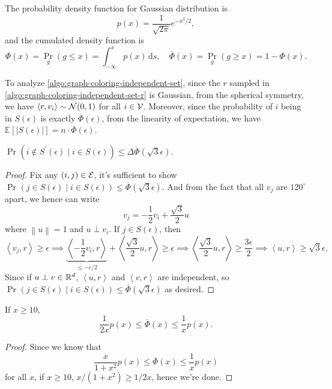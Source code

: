 \begin{prev}
	The probability density function for Gaussian distribution is
	\[
		p(x) = \frac{1}{\sqrt{2\pi } }e^{- x^{2} / 2},
	\]
	and the cumulated density function is
	\[
		\Phi (x) = \Pr_{g}(g \leq x) = \int_{-\infty}^{x} p(x) \,\mathrm{d}s, \quad \overline{\Phi }(x) = \Pr_{g}(g \geq x) = 1 - \Phi (x).
	\]
\end{prev}

To analyze \autoref{algo:graph-coloring-independent-set}, since the \(r\) sampled in \autoref{algo:graph-coloring-independent-set-r} is Gaussian, from the spherical symmetry, we have \(\left\langle r, v_i \right\rangle \sim \mathcal{\MakeUppercase{n}} (0, 1)\) for all \(i\in \mathcal{\MakeUppercase{v}} \). Moreover, since the probability of \(i\) being in \(S(\epsilon )\) is exactly \(\overline{\Phi }(\epsilon )\), from the linearity of expectation, we have \(\mathbb{E}_{}\left[\left\vert S(\epsilon ) \right\vert\right] = n\cdot \overline{\Phi }(\epsilon )\).

\begin{lemma}\label{lma:lec18-1}
	\(\Pr_{}(i \notin S^\prime (\epsilon )\mid i\in S(\epsilon )) \leq \Delta \overline{\Phi }(\sqrt{3}\epsilon)\).
\end{lemma}
\begin{proof}
	Fix any \((i, j)\in \mathcal{\MakeUppercase{e}} \), it's sufficient to show \(\Pr_{}(j\in S(\epsilon )\mid i\in S(\epsilon )) \leq \overline{\Phi}(\sqrt{3}\epsilon)\). And from the fact that all \(v_j\) are \(120^{\circ } \) apart, we hence can write
	\[
		v_j = - \frac{1}{2} v_i + \frac{\sqrt{3}}{2} u
	\]
	where \(\left\lVert u\right\rVert = 1\) and \(u\perp v_i\). If \(j\in S(\epsilon )\), then
	\[
		\left\langle v_j , r \right\rangle \geq \epsilon
		\implies \underbrace{\left\langle -\frac{1}{2}v_i, r \right\rangle}_{\leq - \epsilon / 2} + \left\langle \frac{\sqrt{3}}{2}u, r \right\rangle \geq \epsilon
		\implies \left\langle \frac{\sqrt{3} }{2} u, r \right\rangle \geq \frac{3\epsilon}{2}
		\implies \left\langle u, r \right\rangle \geq \sqrt{3}\epsilon .
	\]
	Since if \(u\perp v\in \mathbb{\MakeUppercase{r}} ^d\), \(\left\langle u, r \right\rangle \) and \(\left\langle v, r \right\rangle \) are independent, so \(\Pr_{}(j\in S(\epsilon )\mid i\in S(\epsilon )) \leq \overline{\Phi }(\sqrt{3} \epsilon )\) as desired.
\end{proof}

\begin{lemma}\label{lma:lec18-2}
	If \(x \geq 10\),
	\[
		\frac{1}{2x} p(x) \leq \overline{\Phi }(x) \leq \frac{1}{x}p(x).
	\]
\end{lemma}
\begin{proof}
	Since we know that
	\[
		\frac{x}{1+x^{2} } p(x) \leq \overline{\Phi }(x) \leq \frac{1}{x}p(x)
	\]
	for all \(x\), if \(x \geq 10\), \(x / (1 + x^{2} ) \geq 1 / 2x\), hence we're done.
\end{proof}

